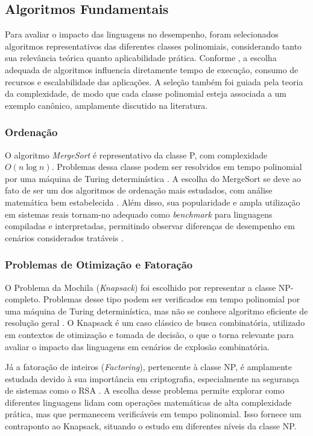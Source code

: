\documentclass[12pt,a4paper]{article}
\newcommand{\eng}[1]{\textit{#1}}
\begin{document}
\subsection{Algoritmos Fundamentais}
Para avaliar o impacto das linguagens no desempenho, foram selecionados algoritmos representativos das diferentes classes polinomiais, considerando tanto sua relevância teórica quanto aplicabilidade prática. Conforme , a escolha adequada de algoritmos influencia diretamente tempo de execução, consumo de recursos e escalabilidade das aplicações. A seleção também foi guiada pela teoria da complexidade, de modo que cada classe polinomial esteja associada a um exemplo canônico, amplamente discutido na literatura.

\subsubsection{Ordenação}
O algoritmo \eng{MergeSort} é representativo da classe P, com complexidade \(O(n \log n)\). Problemas dessa classe podem ser resolvidos em tempo polinomial por uma máquina de Turing determinística \cite{sipser2012}. A escolha do MergeSort se deve ao fato de ser um dos algoritmos de ordenação mais estudados, com análise matemática bem estabelecida \cite{knuth1998}. Além disso, sua popularidade e ampla utilização em sistemas reais tornam-no adequado como \eng{benchmark} para linguagens compiladas e interpretadas, permitindo observar diferenças de desempenho em cenários considerados tratáveis \cite{tanenbaum2015}.

\subsubsection{Problemas de Otimização e Fatoração}
O Problema da Mochila (\eng{Knapsack}) foi escolhido por representar a classe NP-completo. Problemas desse tipo podem ser verificados em tempo polinomial por uma máquina de Turing determinística, mas não se conhece algoritmo eficiente de resolução geral \cite{garey1979}. O Knapsack é um caso clássico de busca combinatória, utilizado em contextos de otimização e tomada de decisão, o que o torna relevante para avaliar o impacto das linguagens em cenários de explosão combinatória.

Já a fatoração de inteiros (\eng{Factoring}), pertencente à classe NP, é amplamente estudada devido à sua importância em criptografia, especialmente na segurança de sistemas como o RSA \cite{rivest1978}. A escolha desse problema permite explorar como diferentes linguagens lidam com operações matemáticas de alta complexidade prática, mas que permanecem verificáveis em tempo polinomial. Isso fornece um contraponto ao Knapsack, situando o estudo em diferentes níveis da classe NP.
\end{document}

